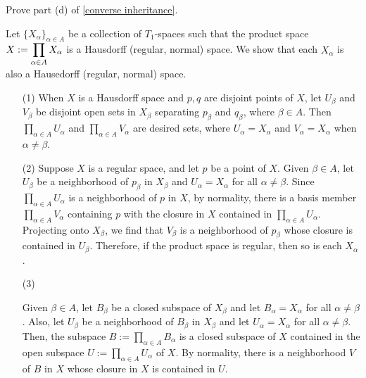 \begin{prob}\label{inheritance - (d)}
    Prove part (d) of \cref{converse inheritance}.
\end{prob}
\begin{sol}
    Let $\{X_\alpha\}_{\alpha\in A}$ be a collection of $T_1$-spaces such that the product space $\displaystyle{X:=\prod_{\alpha\in A} X_\alpha}$ is a Hausdorff (regular, normal) space.
    We show that each $X_\alpha$ is also a Hausedorff (regular, normal) space.
    \begin{enumerate}
        \item[(1)]
        {
            When $X$ is a Hausdorff space and $p, q$ are disjoint points of $X$, let $U_\beta$ and $V_\beta$ be disjoint open sets in $X_\beta$ separating $p_\beta$ and $q_\beta$, where $\beta\in A$.
            Then $\prod_{\alpha\in A} U_\alpha$ and $\prod_{\alpha\in A} V_\alpha$ are desired sets, where $U_\alpha=X_\alpha$ and $V_\alpha=X_\alpha$ when $\alpha\neq\beta$.
        }
        \item[(2)]
        {
            Suppose $X$ is a regular space, and let $p$ be a point of $X$.
            Given $\beta\in A$, let $U_\beta$ be a neighborhood of $p_\beta$ in $X_\beta$ and $U_\alpha=X_\alpha$ for all $\alpha\neq\beta$.
            Since $\prod_{\alpha\in A}U_\alpha$ is a neighborhood of $p$ in $X$, by normality, there is a basis member $\prod_{\alpha\in A}V_\alpha$ containing $p$ with the closure in $X$ contained in $\prod_{\alpha\in A}U_\alpha$.
            Projecting onto $X_\beta$, we find that $V_\beta$ is a neighborhood of $p_\beta$ whose closure is contained in $U_\beta$.
            Therefore, if the product space is regular, then so is each $X_\alpha$.
        }
        \item[(3)]
        {
            Given $\beta\in A$, let $B_\beta$ be a closed subspace of $X_\beta$ and let $B_\alpha=X_\alpha$ for all $\alpha\neq\beta$.
            Also, let $U_\beta$ be a neighborhood of $B_\beta$ in $X_\beta$ and let $U_\alpha=X_\alpha$ for all $\alpha\neq\beta$.
            Then, the subspace $B:=\prod_{\alpha\in A}B_\alpha$ is a closed subspace of $X$ contained in the open subspace $U:=\prod_{\alpha\in A} U_\alpha$ of $X$.
            By normality, there is a neighborhood $V$ of $B$ in $X$ whose closure in $X$ is contained in $U$.

}
\end{enumerate}
\end{sol}
